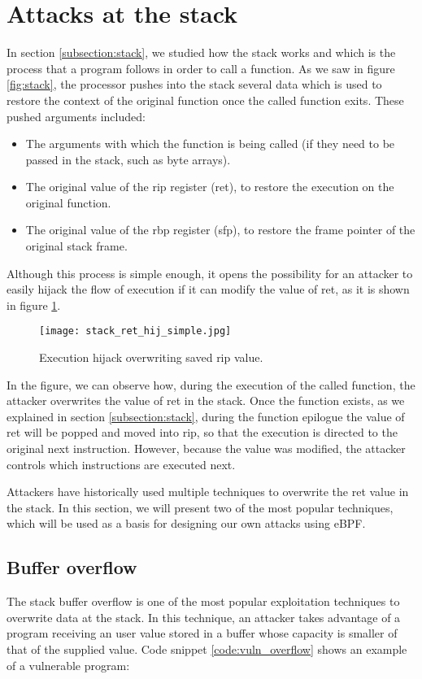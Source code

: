 \section{Attacks at the stack} \label{section:attacks_stack}
In section \ref{subsection:stack}, we studied how the stack works and which is the process that a program follows in order to call a function. As we saw in figure \ref{fig:stack}, the processor pushes into the stack several data which is used to restore the context of the original function once the called function exits. These pushed arguments included:
\begin{itemize}
\item The arguments with which the function is being called (if they need to be passed in the stack, such as byte arrays).
\item The original value of the rip register (ret), to restore the execution on the original function.
\item The original value of the rbp register (sfp), to restore the frame pointer of the original stack frame.
\end{itemize}

Although this process is simple enough, it opens the possibility for an attacker to easily hijack the flow of execution if it can modify the value of ret, as it is shown in figure \ref{fig:stack_ret_hij_simple}.
\begin{figure}[htbp]
	\centering
	\texttt{[image: stack\_ret\_hij\_simple.jpg]}
	\caption{Execution hijack overwriting saved rip value.}
	\label{fig:stack_ret_hij_simple}
\end{figure}

In the figure, we can observe how, during the execution of the called function, the attacker overwrites the value of ret in the stack. Once the function exists, as we explained in section \ref{subsection:stack}, during the function epilogue the value of ret will be popped and moved into rip, so that the execution is directed to the original next instruction. However, because the value was modified, the attacker controls which instructions are executed next.

Attackers have historically used multiple techniques to overwrite the ret value in the stack. In this section, we will present two of the most popular techniques, which will be used as a basis for designing our own attacks using eBPF.

\subsection{Buffer overflow} \label{subsection: buf_overflow}
The stack buffer overflow is one of the most popular exploitation techniques to overwrite data at the stack. In this technique, an attacker takes advantage of a program receiving an user value stored in a buffer whose capacity is smaller of that of the supplied value. Code snippet \ref{code:vuln_overflow} shows an example of a vulnerable program:

